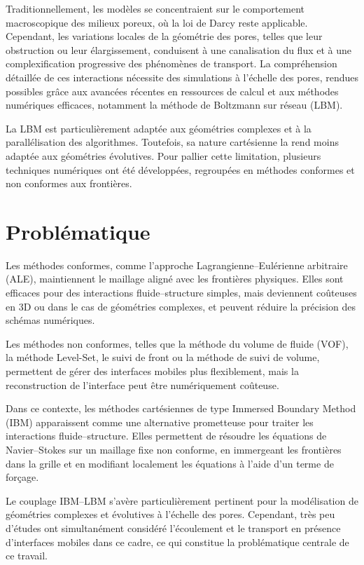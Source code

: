 \documentclass[12pt,a4paper]{report}
\begin{document}
Traditionnellement, les modèles se concentraient sur le comportement macroscopique des milieux poreux, où la loi de Darcy reste applicable. Cependant, les variations locales de la géométrie des pores, telles que leur obstruction ou leur élargissement, conduisent à une canalisation du flux et à une complexification progressive des phénomènes de transport. La compréhension détaillée de ces interactions nécessite des simulations à l’échelle des pores, rendues possibles grâce aux avancées récentes en ressources de calcul et aux méthodes numériques efficaces, notamment la méthode de Boltzmann sur réseau (LBM).

La LBM est particulièrement adaptée aux géométries complexes et à la parallélisation des algorithmes. Toutefois, sa nature cartésienne la rend moins adaptée aux géométries évolutives. Pour pallier cette limitation, plusieurs techniques numériques ont été développées, regroupées en méthodes conformes et non conformes aux frontières.
\section{Problématique}
Les méthodes conformes, comme l’approche Lagrangienne–Eulérienne arbitraire (ALE), maintiennent le maillage aligné avec les frontières physiques. Elles sont efficaces pour des interactions fluide–structure simples, mais deviennent coûteuses en 3D ou dans le cas de géométries complexes, et peuvent réduire la précision des schémas numériques.

Les méthodes non conformes, telles que la méthode du volume de fluide (VOF), la méthode Level-Set, le suivi de front ou la méthode de suivi de volume, permettent de gérer des interfaces mobiles plus flexiblement, mais la reconstruction de l’interface peut être numériquement coûteuse.

Dans ce contexte, les méthodes cartésiennes de type Immersed Boundary Method (IBM) apparaissent comme une alternative prometteuse pour traiter les interactions fluide–structure. Elles permettent de résoudre les équations de Navier–Stokes sur un maillage fixe non conforme, en immergeant les frontières dans la grille et en modifiant localement les équations à l’aide d’un terme de forçage.

Le couplage IBM–LBM s’avère particulièrement pertinent pour la modélisation de géométries complexes et évolutives à l’échelle des pores. Cependant, très peu d’études ont simultanément considéré l’écoulement et le transport en présence d’interfaces mobiles dans ce cadre, ce qui constitue la problématique centrale de ce travail.
\end{document}
